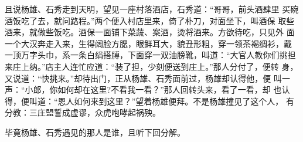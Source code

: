 且说杨雄、石秀走到天明，望见一座村落酒店，石秀道：“哥哥，前头酒肆里
买碗酒饭吃了去，就问路程。”两个便入村店里来，倚了朴刀，对面坐下，叫酒保
取些酒来，就做些饭吃。酒保一面铺下菜蔬、案酒，烫将酒来。方欲待吃，只见外
面一个大汉奔走入来，生得阔脸方腮，眼鲜耳大，貌丑形粗，穿一领茶褐绸衫，戴
一顶万字头巾，系一条白绢搭膊，下面穿一双油膀靴，叫道：“大官人教你们挑担
来庄上纳。”店主人连忙应道：“装了担，少刻便送到庄上。”那人分付了，便转
身，又说道：“快挑来。”却待出门，正从杨雄、石秀面前过，杨雄却认得他，便
叫一声：“小郎，你如何却在这里?不看我一看？”那人回转头来，看了一看，却
也认得，便叫道：“恩人如何来到这里？”望着杨雄便拜。不是杨雄撞见了这个人，
有分教：三庄盟誓成虚谬，众虎咆哮起祸殃。

毕竟杨雄、石秀遇见的那人是谁，且听下回分解。